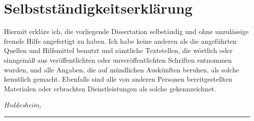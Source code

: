 %
\chapter*{Selbstständigkeitserklärung}
\label{sec:declaration}
\thispagestyle{empty}

Hiermit erkläre ich, die vorliegende Dissertation selbständig und ohne
unzulässige fremde Hilfe angefertigt zu haben. Ich habe keine anderen als die
angeführten Quellen und Hilfsmittel benutzt und sämtliche Textstellen, die
wörtlich oder sinngemäß aus veröffentlichten oder unveröffentlichten
Schriften entnommen wurden, und alle Angaben, die auf mündlichen
Auskünften beruhen, als solche kenntlich gemacht. Ebenfalls sind alle von
anderen Personen bereitgestellten Materialen oder erbrachten Dienstleistungen
als solche gekennzeichnet.
\bigskip

\noindent\textit{Heddesheim, \thesisDate}

\smallskip

\begin{flushright}
	\begin{minipage}{5cm}
		\rule{\textwidth}{1pt}
		\centering\thesisName
	\end{minipage}
\end{flushright}

